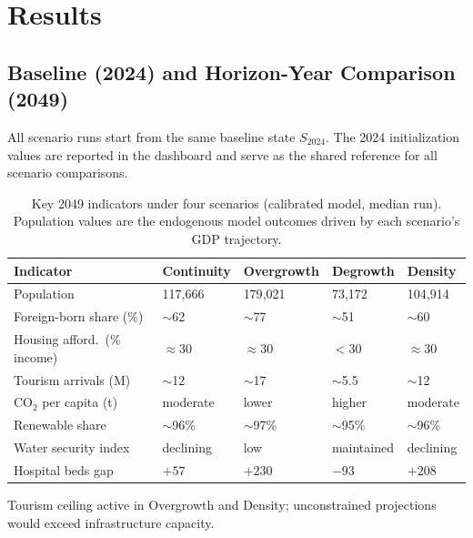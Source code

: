 \documentclass[urbansci,article,submit,pdftex,moreauthors]{Definitions/mdpi}
\begin{document}
\section{Results}
\label{sec:results}

\subsection{Baseline (2024) and Horizon-Year Comparison (2049)}
\label{subsec:baseline_and_2049}

All scenario runs start from the same baseline state $S_{2024}$. The 2024
initialization values are reported in the dashboard and serve as the shared
reference for all scenario comparisons.

\begin{table}[H]
\caption{Key 2049 indicators under four scenarios (calibrated model, median
run). Population values are the endogenous model outcomes driven by each
scenario's GDP trajectory.}
\label{tab:scenarios_2049}
\begin{threeparttable}
\begin{tabularx}{\textwidth}{p{3.8cm}XXXX}
\toprule
\textbf{Indicator} & \textbf{Continuity} & \textbf{Overgrowth}
                   & \textbf{Degrowth}   & \textbf{Density} \\
\midrule
Population
  & 117{,}666 & 179{,}021 & 73{,}172 & 104{,}914 \\
Foreign-born share (\%)
  & $\sim$62 & $\sim$77 & $\sim$51 & $\sim$60 \\
Housing afford.\ (\% income)
  & $\approx$30 & $\approx$30 & $<$30 & $\approx$30 \\
Tourism arrivals (M)\tnote{$\dagger$}
  & $\sim$12 & $\sim$17 & $\sim$5.5 & $\sim$12 \\
CO$_2$ per capita (t)
  & moderate & lower & higher & moderate \\
Renewable share
  & $\sim$96\% & $\sim$97\% & $\sim$95\% & $\sim$96\% \\
Water security index
  & declining & low & maintained & declining \\
Hospital beds gap
  & $+57$ & $+230$ & $-93$ & $+208$ \\
\bottomrule
\end{tabularx}
\begin{tablenotes}
  \item[$\dagger$] Tourism ceiling active in Overgrowth and Density;
        unconstrained projections would exceed infrastructure capacity.
\end{tablenotes}
\end{threeparttable}
\end{table}
\end{document}
